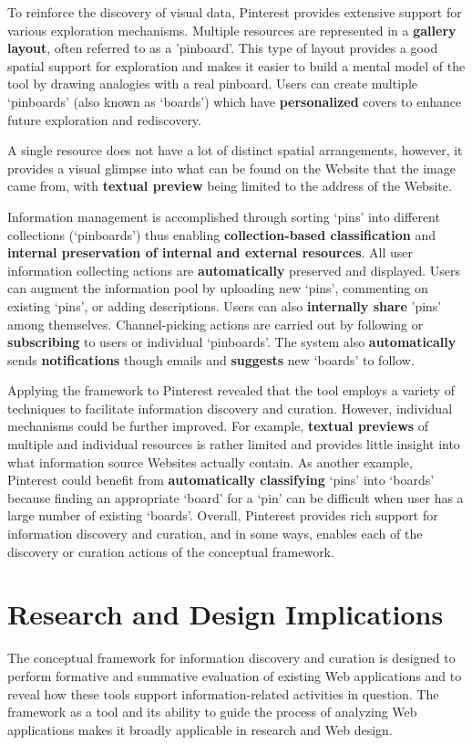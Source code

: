\documentclass{sigchi}
\begin{document}
{{{To reinforce the discovery of visual data, Pinterest provides extensive support for various exploration mechanisms. Multiple resources are represented in a \textbf{gallery layout}, often referred to as a 'pinboard'. This type of layout provides a good spatial support for exploration and makes it easier to build a mental model of the tool by drawing analogies with a real pinboard. Users can create multiple `pinboards' (also known as `boards') which have \textbf{personalized} covers to enhance future exploration and rediscovery.

A single resource does not have a lot of distinct spatial arrangements, however, it provides a visual glimpse into what can be found on the Website that the image came from, with \textbf{textual preview} being limited to the address of the Website. 

Information management is accomplished through sorting `pins' into different collections (`pinboards') thus enabling \textbf{collection-based classification} and \textbf{internal preservation of internal and external resources}. All user information collecting actions are \textbf{automatically} preserved and displayed. Users can augment the information pool by uploading new `pins', commenting on existing `pins', or adding descriptions. Users can also \textbf{internally share} 'pins' among themselves. Channel-picking actions are carried out by following or \textbf{subscribing} to users or individual `pinboards'. The system also \textbf{automatically} sends \textbf{notifications} though emails and \textbf{suggests} new `boards' to follow.

Applying the framework to Pinterest revealed that the tool employs a  variety of techniques to facilitate information discovery and curation. However, individual mechanisms could be further improved. For example, \textbf{textual previews} of multiple and individual resources is rather limited and provides little insight into what information source Websites actually contain. As another example, Pinterest could benefit from \textbf{automatically classifying} `pins' into `boards' because finding an appropriate `board' for a `pin' can be difficult when user has a large number of existing `boards'. Overall, Pinterest provides rich support for information discovery and curation, and in some ways, enables each of the discovery or curation actions of the conceptual framework. 
} %

\section{Research and Design Implications}
\label{section:implications}
The conceptual framework for information discovery and curation is designed to perform formative and summative evaluation of existing Web applications and to reveal how these tools support information-related activities in question. The framework as a tool and its ability to guide the process of analyzing Web applications makes it broadly applicable in research and Web design. 

}}
\end{document}
